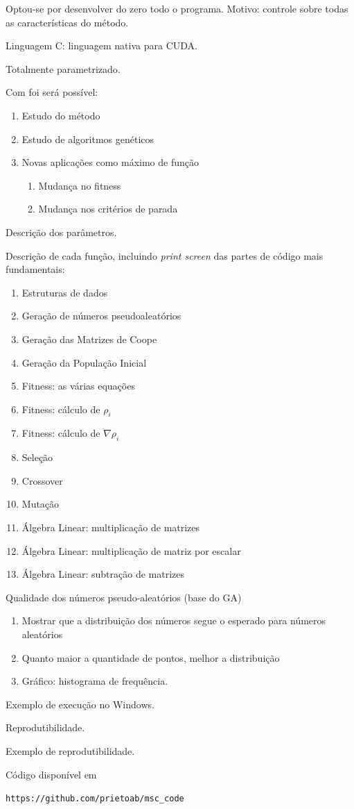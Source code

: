 	Optou-se por desenvolver do zero todo o programa. Motivo: controle sobre todas as características do método.

	Linguagem C: linguagem nativa para CUDA.

	Totalmente parametrizado. 

	Com foi será possível:

	\begin{enumerate}
		\item Estudo do método 
		\item Estudo de algoritmos genéticos
		\item Novas aplicações como máximo de função
		\begin{enumerate}
			\item Mudança no fitness 
			\item Mudança nos critérios de parada
		\end{enumerate}	
	\end{enumerate}


	Descrição dos parâmetros.

	Descrição de cada função, incluindo \textit{print screen} das partes de código mais fundamentais:

	\begin{enumerate}
		\item Estruturas de dados
		\item Geração de números pseudoaleatórios
		\item Geração das Matrizes de Coope
		\item Geração da População Inicial
		\item Fitness: as várias equações
		\item Fitness: cálculo de $\rho_i$
		\item Fitness: cálculo de $\nabla\rho_i$
		\item Seleção
		\item Crossover
		\item Mutação
		\item Álgebra Linear: multiplicação de matrizes
		\item Álgebra Linear: multiplicação de matriz por escalar
		\item Álgebra Linear: subtração de matrizes
	\end{enumerate}

	Qualidade dos números pseudo-aleatórios (base do GA)
	
	

	\begin{enumerate}
			\item Mostrar que a distribuição dos números segue o esperado para números aleatórios
			\item Quanto maior a quantidade de pontos, melhor a distribuição
			\item Gráfico: histograma de frequência.
	\end{enumerate}

	Exemplo de execução no Windows.

	Reprodutibilidade.
	
	Exemplo de reprodutibilidade.

	Código disponível em

	\texttt{https://github.com/prietoab/msc\_code}